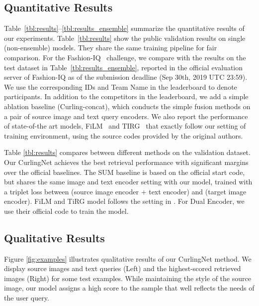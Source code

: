 \documentclass[10pt,twocolumn,letterpaper]{article}
\begin{document}
\subsection{Quantitative Results}
Table~\ref{tbl:results}--\ref{tbl:results_ensemble} summarize the quantitative results of our experiments. 
Table~\ref{tbl:results} show the public validation results on single (\ie non-ensemble) models.
They share the same training pipeline for fair comparison.
For the Fashion-IQ~\cite{fashioniq-arxiv-2019} challenge, we compare with the results on the test dataset in Table~\ref{tbl:results_ensemble}, reported in the official evaluation server of Fashion-IQ as of the submission deadline (\ie Sep 30th, 2019 UTC 23:59).
We use the corresponding IDs and Team Name in the leaderboard to denote participants. 
In addition to the competitors in the leaderboard, we add a simple ablation baseline (Curling-concat), which conducts the simple fusion methods on a pair of source image and text query encoders. 
We also report the performance of state-of-the art models, FiLM~\cite{perez-AAAI-2018} and TIRG~\cite{vo-cvpr-2019} that exactly follow our setting of training environment, using the source codes provided by the original authors. 

Table \ref{tbl:results} compares between different methods on the validation dataset.
Our CurlingNet achieves the best retrieval performance with significant margins over the official baselines. 
The SUM baseline is based on the official start code, but shares the same image and text encoder setting with our model, trained with a triplet loss between (source image encoder + text encoder) and (target image encoder).
FiLM and TiRG model follows the setting in \cite{vo-cvpr-2019}. 
For Dual Encoder, we use their official code to train the model.

\subsection{Qualitative Results}
Figure \ref{fig:examples} illustrates qualitative results of our CurlingNet method.
We display source images and text queries (Left) and the highest-scored retrieved images (Right) for some test examples.
While maintaining the style of the source image, our model assigns a high score to the sample that well reflects the needs of the user query.
\end{document}
